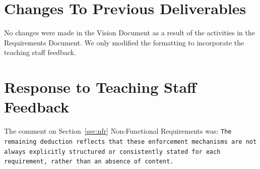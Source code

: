 \section{Changes To Previous Deliverables}
No changes were made in the Vision Document as a result of the activities in the Requirements Document. We only modified the formatting to incorporate the teaching staff feedback.  
\section{Response to Teaching Staff Feedback}





The comment on Section~\ref{sec:nfr} Non-Functional Requirements was: \texttt{The remaining deduction reflects that these enforcement mechanisms are not always explicitly structured or consistently stated for each requirement, rather than an absence of content.}

